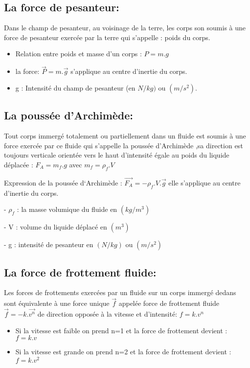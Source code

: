 \documentclass[12pt]{article}
\begin{document}
\subsection{La force de pesanteur: }
Dans le champ de pesanteur, au voisinage de la terre, les corps son soumis à une force de pesanteur exercée par la terre qui s'appelle : poids du corps.

\begin{itemize}
	\item Relation entre poids et masse d’un corps : $P = m.g$
		\item la force: $\vec{P} = m.\vec{g}$ s'applique au centre d'inertie du corps.

		\item g : Intensité du champ de pesanteur (en $ N/kg)$ ou $(m/s^2)$.

\end{itemize}
\subsection{La poussée d'Archimède:}
Tout corps immergé totalement ou partiellement dans un fluide est soumis à une force exercée par ce fluide qui
s'appelle la poussée d'Archimède ,sa direction est toujours verticale orientée vers le haut d'intensité égale au poids
du liquide déplacée : $F_A = m_f.g$ avec $m_f = \rho_f.V$

Expression de la poussée d‘Archimède : $\vec{F_A} = - \rho_f.V.\vec{g}$ elle s'applique au centre d'inertie du corps.

- $\rho_f$ : la masse volumique du fluide en $(kg/m^3)$

- V :  volume du liquide déplacé en $(m^3)$

- g : intensité de pesanteur en $(N/kg)$ ou $(m/s^2)$

\subsection{La force de frottement fluide:}
Les forces de frottements exercées par un fluide sur un corps immergé dedans sont équivalente à une force unique $\vec{f}$ appelée force de frottement fluide $\vec{f} = -k.\vec{v^n}$ de direction opposée à la vitesse et d'intensité: $f = k.v^n$

\begin{itemize}
	\item Si la vitesse est faible on prend n=1 et la force de frottement devient : $f = k.v$
	\item Si la vitesse est grande on prend n=2 et la force de frottement devient : $f = k.v^2$
\end{itemize}
\end{document}
